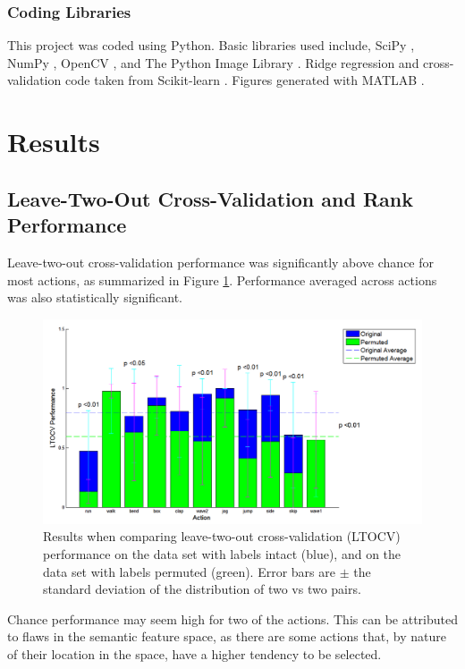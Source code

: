 \documentclass{article}
\begin{document}
\subsubsection{Coding Libraries}
This project was coded using Python. Basic libraries used include, SciPy \cite{scipy}, NumPy \cite{numpy}, OpenCV \cite{opencv}, and The Python Image Library \cite{pil}. Ridge regression and cross-validation code taken from Scikit-learn \cite{scikit}. Figures generated with MATLAB \cite{matlab}.

\section{Results}

\subsection{Leave-Two-Out Cross-Validation and Rank Performance}
Leave-two-out cross-validation performance was significantly above chance for most actions, as summarized in Figure \ref{ltocvplot}.  Performance averaged across actions was also statistically significant.

\begin{figure}[h]
  \centering
  \includegraphics[width=.9\linewidth]{ltocv_snap_new}
  \caption{Results when comparing leave-two-out cross-validation (LTOCV) performance on the data set with labels intact (blue), and on the data set with labels permuted (green). Error bars are $\pm$ the standard deviation of the distribution of two vs two pairs.}
  \label{ltocvplot}
\end{figure}

Chance performance may seem high for two of the actions. This can be attributed to flaws in the semantic feature space, as there are some actions that, by nature of their location in the space, have a higher tendency to be selected.
\end{document}
